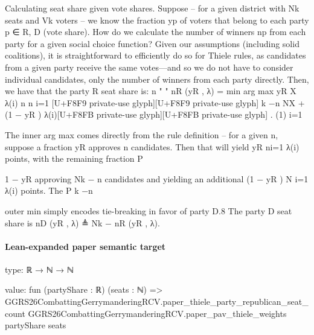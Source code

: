 \documentclass[10pt]{article}
\begin{document}
\begin{ReviewVerbatim}
Calculating seat share given vote shares. Suppose – for a given district with Nk seats and
Vk voters – we know the fraction yp of voters that belong to each party p ∈ {R, D} (vote share).
How do we calculate the number of winners np from each party for a given social choice function?
   Given our assumptions (including solid coalitions), it is straightforward to efficiently do so for
Thiele rules, as candidates from a given party receive the same votes—and so we do not have to
consider individual candidates, only the number of winners from each party directly. Then, we have
that the party R seat share is:
                                                                             n
                                                         "           "
                                    nR (yR , λ) = min arg max yR
                                                                             X
                                                                                   λ(i)
                                                     n           n
                                                                             i=1
                                                                                   [U+F8F9 private-use glyph][U+F8F9 private-use glyph]
                                                                      k −n
                                                                     NX
                                                      +(1 − yR )             λ(i)[U+F8FB private-use glyph][U+F8FB private-use glyph] .                               (1)
                                                                      i=1

    The inner arg max comes directly from the rule definition – for a given n, suppose a fraction
yR approves n candidates. Then that will yield yR ni=1 λ(i) points, with the remaining fraction
                                                      P

1 − yR approving Nk − n candidates and yielding an additional (1 − yR ) N     i=1 λ(i) points. The
                                                                           P k −n

outer min simply encodes tie-breaking in favor of party D.8 The party D seat share is nD (yR , λ) ≜
Nk − nR (yR , λ).
\end{ReviewVerbatim}



\paragraph{Lean-expanded paper semantic target}
\begin{ReviewVerbatim}
type:
ℝ → ℕ → ℕ

value:
fun (partyShare : ℝ) (seats : ℕ) =>
  GGRS26CombattingGerrymanderingRCV.paper_thiele_party_republican_seat_count
    GGRS26CombattingGerrymanderingRCV.paper_pav_thiele_weights partyShare seats
\end{ReviewVerbatim}
\end{document}

